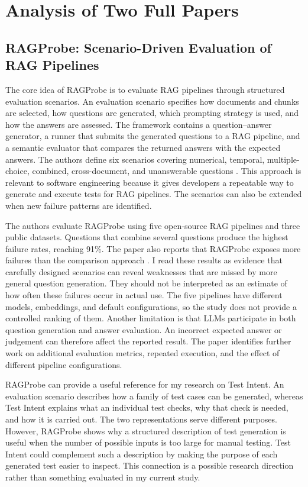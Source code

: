 \section{Analysis of Two Full Papers}

\subsection{RAGProbe: Scenario-Driven Evaluation of RAG Pipelines}

The core idea of RAGProbe is to evaluate RAG pipelines through structured evaluation scenarios. An evaluation scenario specifies how documents and chunks are selected, how questions are generated, which prompting strategy is used, and how the answers are assessed. The framework contains a question--answer generator, a runner that submits the generated questions to a RAG pipeline, and a semantic evaluator that compares the returned answers with the expected answers. The authors define six scenarios covering numerical, temporal, multiple-choice, combined, cross-document, and unanswerable questions \cite{DBLP:conf/cain/SivasothyBKRV25}. This approach is relevant to software engineering because it gives developers a repeatable way to generate and execute tests for RAG pipelines. The scenarios can also be extended when new failure patterns are identified.

The authors evaluate RAGProbe using five open-source RAG pipelines and three public datasets. Questions that combine several questions produce the highest failure rates, reaching 91\%. The paper also reports that RAGProbe exposes more failures than the comparison approach \cite{DBLP:conf/cain/SivasothyBKRV25}. I read these results as evidence that carefully designed scenarios can reveal weaknesses that are missed by more general question generation. They should not be interpreted as an estimate of how often these failures occur in actual use. The five pipelines have different models, embeddings, and default configurations, so the study does not provide a controlled ranking of them. Another limitation is that LLMs participate in both question generation and answer evaluation. An incorrect expected answer or judgement can therefore affect the reported result. The paper identifies further work on additional evaluation metrics, repeated execution, and the effect of different pipeline configurations.

RAGProbe can provide a useful reference for my research on Test Intent. An evaluation scenario describes how a family of test cases can be generated, whereas Test Intent explains what an individual test checks, why that check is needed, and how it is carried out. The two representations serve different purposes. However, RAGProbe shows why a structured description of test generation is useful when the number of possible inputs is too large for manual testing. Test Intent could complement such a description by making the purpose of each generated test easier to inspect. This connection is a possible research direction rather than something evaluated in my current study.

